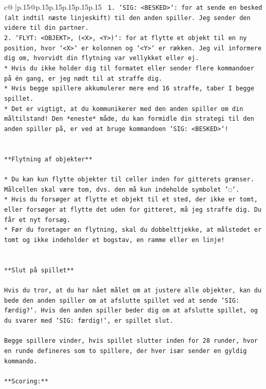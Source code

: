 \documentclass{article}
\begin{document}
{\begin{supertabular}{c@{$\;$}|p{.15\linewidth}@{}p{.15\linewidth}p{.15\linewidth}p{.15\linewidth}p{.15\linewidth}p{.15\linewidth}}
{{{\texttt{ 1. `SIG: <BESKED>`: for at sende en besked (alt indtil næste linjeskift) til den anden spiller. Jeg sender den videre til din partner.} \\
\texttt{2. `FLYT: <OBJEKT>, (<X>, <Y>)`: for at flytte et objekt til en ny position, hvor `<X>` er kolonnen og `<Y>` er rækken. Jeg vil informere dig om, hvorvidt din flytning var vellykket eller ej.} \\
\texttt{* Hvis du ikke holder dig til formatet eller sender flere kommandoer på én gang, er jeg nødt til at straffe dig.} \\
\texttt{* Hvis begge spillere akkumulerer mere end 16 straffe, taber I begge spillet.} \\
\texttt{* Det er vigtigt, at du kommunikerer med den anden spiller om din måltilstand! Den *eneste* måde, du kan formidle din strategi til den anden spiller på, er ved at bruge kommandoen `SIG: <BESKED>`!} \\
\\ 
\\ 
\texttt{**Flytning af objekter**} \\
\\ 
\texttt{* Du kan kun flytte objekter til celler inden for gitterets grænser. Målcellen skal være tom, dvs. den må kun indeholde symbolet '◌'.} \\
\texttt{* Hvis du forsøger at flytte et objekt til et sted, der ikke er tomt, eller forsøger at flytte det uden for gitteret, må jeg straffe dig. Du får et nyt forsøg.} \\
\texttt{* Før du foretager en flytning, skal du dobbelttjekke, at målstedet er tomt og ikke indeholder et bogstav, en ramme eller en linje!} \\
\\ 
\\ 
\texttt{**Slut på spillet**} \\
\\ 
\texttt{Hvis du tror, at du har nået målet om at justere alle objekter, kan du bede den anden spiller om at afslutte spillet ved at sende `SIG: færdig?`. Hvis den anden spiller beder dig om at afslutte spillet, og du svarer med `SIG: færdig!`, er spillet slut.} \\
\\ 
\texttt{Begge spillere vinder, hvis spillet slutter inden for 28 runder, hvor en runde defineres som to spillere, der hver især sender en gyldig kommando.} \\
\\ 
\texttt{**Scoring:**} \\
}}}
\end{supertabular}}
\end{document}
